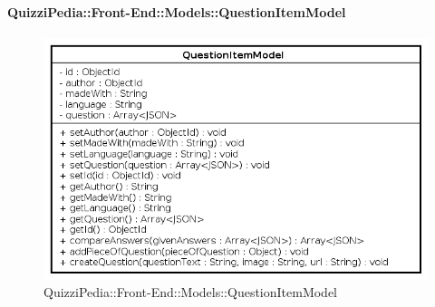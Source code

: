 \paragraph{QuizziPedia::Front-End::Models::QuestionItemModel}
		
		\label{QuizziPedia::Front-End::Models::QuestionItemModel}
		
		\begin{figure}[ht]
			\centering
			\includegraphics[scale=0.6,keepaspectratio]{UML/Classi/Front-End/QuizziPedia_Front-end_Models_QuestionItemModel.png}
			\caption{QuizziPedia::Front-End::Models::QuestionItemModel}
		\end{figure} \FloatBarrier
		
